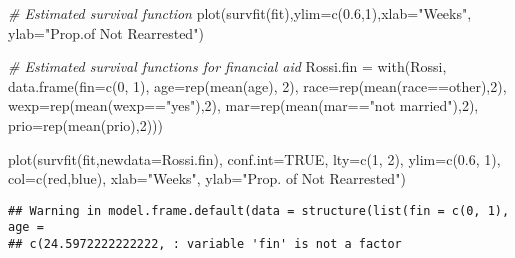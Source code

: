 \documentclass[
]{article}
\newenvironment{Shaded}{\begin{snugshade}}{\end{snugshade}}
\newcommand{\AttributeTok}[1]{\textcolor[rgb]{0.77,0.63,0.00}{#1}}
\newcommand{\CommentTok}[1]{\textcolor[rgb]{0.56,0.35,0.01}{\textit{#1}}}
\newcommand{\ConstantTok}[1]{\textcolor[rgb]{0.00,0.00,0.00}{#1}}
\newcommand{\DecValTok}[1]{\textcolor[rgb]{0.00,0.00,0.81}{#1}}
\newcommand{\FloatTok}[1]{\textcolor[rgb]{0.00,0.00,0.81}{#1}}
\newcommand{\FunctionTok}[1]{\textcolor[rgb]{0.00,0.00,0.00}{#1}}
\newcommand{\NormalTok}[1]{#1}
\newcommand{\OtherTok}[1]{\textcolor[rgb]{0.56,0.35,0.01}{#1}}
\newcommand{\SpecialCharTok}[1]{\textcolor[rgb]{0.00,0.00,0.00}{#1}}
\newcommand{\StringTok}[1]{\textcolor[rgb]{0.31,0.60,0.02}{#1}}
\begin{document}
\begin{Shaded}
\begin{Highlighting}[]
\CommentTok{\# Estimated survival function}
\FunctionTok{plot}\NormalTok{(}\FunctionTok{survfit}\NormalTok{(fit),}\AttributeTok{ylim=}\FunctionTok{c}\NormalTok{(}\FloatTok{0.6}\NormalTok{,}\DecValTok{1}\NormalTok{),}\AttributeTok{xlab=}\StringTok{"Weeks"}\NormalTok{, }\AttributeTok{ylab=}\StringTok{"Prop.of Not Rearrested"}\NormalTok{)}


\CommentTok{\# Estimated survival functions for financial aid}
\NormalTok{Rossi.fin }\OtherTok{=} \FunctionTok{with}\NormalTok{(Rossi, }\FunctionTok{data.frame}\NormalTok{(}\AttributeTok{fin=}\FunctionTok{c}\NormalTok{(}\DecValTok{0}\NormalTok{, }\DecValTok{1}\NormalTok{), }\AttributeTok{age=}\FunctionTok{rep}\NormalTok{(}\FunctionTok{mean}\NormalTok{(age), }\DecValTok{2}\NormalTok{), }
                                   \AttributeTok{race=}\FunctionTok{rep}\NormalTok{(}\FunctionTok{mean}\NormalTok{(race}\SpecialCharTok{==}\StringTok{\textquotesingle{}other\textquotesingle{}}\NormalTok{),}\DecValTok{2}\NormalTok{), }
                                   \AttributeTok{wexp=}\FunctionTok{rep}\NormalTok{(}\FunctionTok{mean}\NormalTok{(wexp}\SpecialCharTok{==}\StringTok{"yes"}\NormalTok{),}\DecValTok{2}\NormalTok{), }
                                   \AttributeTok{mar=}\FunctionTok{rep}\NormalTok{(}\FunctionTok{mean}\NormalTok{(mar}\SpecialCharTok{==}\StringTok{"not married"}\NormalTok{),}\DecValTok{2}\NormalTok{),}
                                   \AttributeTok{prio=}\FunctionTok{rep}\NormalTok{(}\FunctionTok{mean}\NormalTok{(prio),}\DecValTok{2}\NormalTok{)))}

\FunctionTok{plot}\NormalTok{(}\FunctionTok{survfit}\NormalTok{(fit,}\AttributeTok{newdata=}\NormalTok{Rossi.fin), }\AttributeTok{conf.int=}\ConstantTok{TRUE}\NormalTok{,}
     \AttributeTok{lty=}\FunctionTok{c}\NormalTok{(}\DecValTok{1}\NormalTok{, }\DecValTok{2}\NormalTok{), }\AttributeTok{ylim=}\FunctionTok{c}\NormalTok{(}\FloatTok{0.6}\NormalTok{, }\DecValTok{1}\NormalTok{), }\AttributeTok{col=}\FunctionTok{c}\NormalTok{(}\StringTok{\textquotesingle{}red\textquotesingle{}}\NormalTok{,}\StringTok{\textquotesingle{}blue\textquotesingle{}}\NormalTok{), }
     \AttributeTok{xlab=}\StringTok{"Weeks"}\NormalTok{, }\AttributeTok{ylab=}\StringTok{"Prop. of Not Rearrested"}\NormalTok{)}
\end{Highlighting}
\end{Shaded}

\begin{verbatim}
## Warning in model.frame.default(data = structure(list(fin = c(0, 1), age =
## c(24.5972222222222, : variable 'fin' is not a factor
\end{verbatim}
\end{document}
